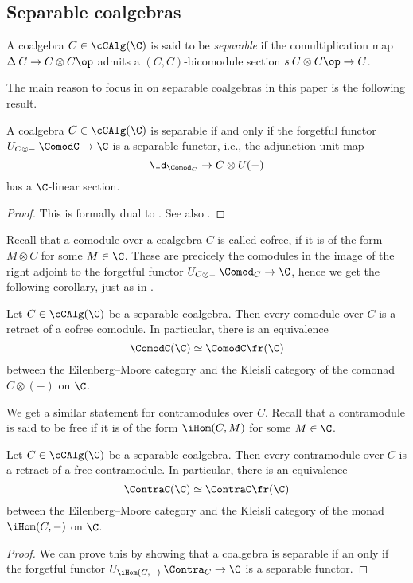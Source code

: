 \subsection{Separable coalgebras}

\begin{definition}
    A coalgebra $C\in \cCAlg(\C)$ is said to be \emph{separable} if the comultiplication map $\Delta\: C\to C\otimes C\op$ admits a $(C,C)$-bicomodule section $s\: C\otimes C\op\to C$.  
\end{definition}

The main reason to focus in on separable coalgebras in this paper is the following result. 

\begin{lemma}
    A coalgebra $C\in \cCAlg(\C)$ is separable if and only if the forgetful functor $U_{C\otimes -}\:\ComodC\to \C$ is a separable functor, i.e., the adjunction unit map 
    \[\Id_{\Comod_C}\to C\otimes U(-)\]
    has a $\C$-linear section. 
\end{lemma}
\begin{proof}
    This is formally dual to \cite[1.13]{ramzi_2023}. See also \cite[3.6]{brzezinski_2010}. 
\end{proof}

Recall that a comodule over a coalgebra $C$ is called cofree, if it is of the form $M\otimes C$ for some $M\in \C$. These are precicely the comodules in the image of the right adjoint to the forgetful functor $U_{C\otimes -}\:\Comod_C\to \C$, hence we get the following corollary, just as in \cite[1.14]{ramzi_2023}. 

\begin{corollary}
    Let $C\in \cCAlg(\C)$ be a separable coalgebra. Then every comodule over $C$ is a retract of a cofree comodule. In particular, there is an equivalence 
    \[\ComodC(\C)\simeq \ComodC\fr(\C)\]
    between the Eilenberg--Moore category and the Kleisli category of the comonad $C\otimes (-)$ on $\C$. 
\end{corollary}

We get a similar statement for contramodules over $C$. Recall that a contramodule is said to be free if it is of the form $\iHom(C,M)$ for some $M\in \C$. 

\begin{proposition}
    Let $C\in \cCAlg(\C)$ be a separable coalgebra. Then every contramodule over $C$ is a retract of a free contramodule. In particular, there is an equivalence 
    \[\ContraC(\C)\simeq \ContraC\fr(\C)\]
    between the Eilenberg--Moore category and the Kleisli category of the monad $\iHom(C,-)$ on $\C$. 
\end{proposition}
\begin{proof}
    We can prove this by showing that a coalgebra is separable if an only if the forgetful functor $U_{\iHom(C,-)}\:\Contra_C\to \C$ is a separable functor. 
\end{proof}

